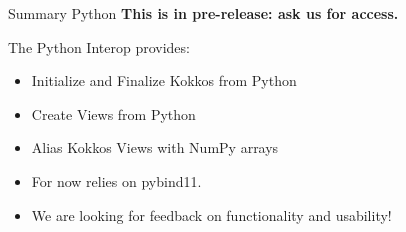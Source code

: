 \begin{frame}[fragile]{Summary Python}
  \textbf{This is in pre-release: ask us for access.}

  \vspace{10pt}
  The Python Interop provides:
  \begin{itemize}
    \item Initialize and Finalize Kokkos from Python
    \item Create Views from Python
    \item Alias Kokkos Views with NumPy arrays
  \end{itemize}

  \vspace{10pt}
  \begin{itemize}
    \item For now relies on pybind11.
    \item We are looking for feedback on functionality and usability!
  \end{itemize}
\end{frame}
